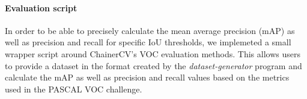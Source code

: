 \paragraph{Evaluation script}

In order to be able to precisely calculate the mean average precision (mAP) as well as precision and recall for specific IoU thresholds, we implemeted a small wrapper script around ChainerCV's VOC evaluation methods\cite{ChainerCVEvalDetectionVOC}.
This allows users to provide a dataset in the format created by the \textit{dataset-generator} program and calculate the mAP as well as precision and recall values based on the metrics used in the PASCAL VOC challenge.
